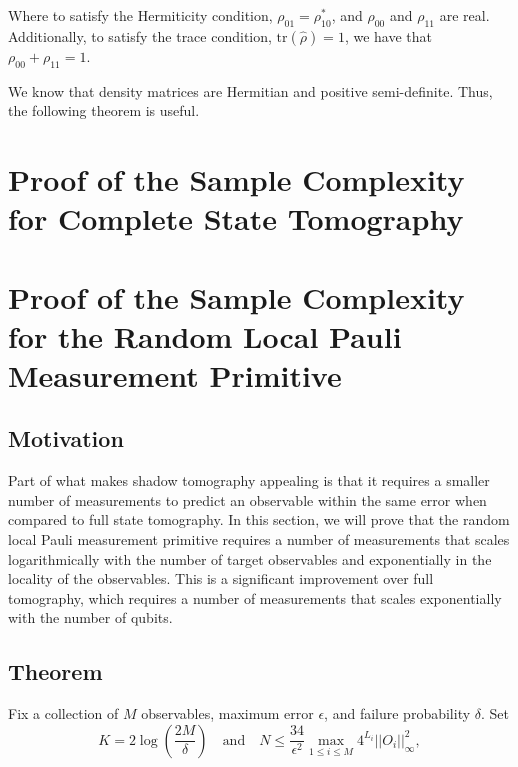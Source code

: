 \documentclass[12pt]{article}
\begin{document}
    Where to satisfy the Hermiticity condition, $\rho_{01} = \rho_{10}^*$, and $\rho_{00}$ and $\rho_{11}$ are real. Additionally, to satisfy the trace condition, $\text{tr}(\hat{\rho}) = 1$, we have that $\rho_{00} + \rho_{11} = 1$. 
    
    We know that density matrices are Hermitian and positive semi-definite. Thus, the following theorem is useful.
    \begin{theorem}
        
    \end{theorem}

    \section{Proof of the Sample Complexity for Complete State Tomography}

    \section{Proof of the Sample Complexity for the Random Local Pauli Measurement Primitive}

    \subsection{Motivation}
    Part of what makes shadow tomography appealing is that it requires a smaller number of measurements to predict an observable within the same error when compared to full state tomography. In this section, we will prove that the random local Pauli measurement primitive requires a number of measurements that scales logarithmically with the number of target observables and exponentially in the locality of the observables. This is a significant improvement over full tomography, which requires a number of measurements that scales exponentially with the number of qubits.

    \subsection{Theorem}

    Fix a collection of $M$ observables, maximum error $\epsilon$, and failure probability $\delta$. Set 
    \begin{equation*}
        K = 2 \log{\left(\frac{2M}{\delta}\right)} \quad \text{and} \quad N \leq \frac{34}{\epsilon^2} \max_{1 \leq i \leq M} 4^{L_i} ||O_i||^2_\infty,
    \end{equation*}
\end{document}
